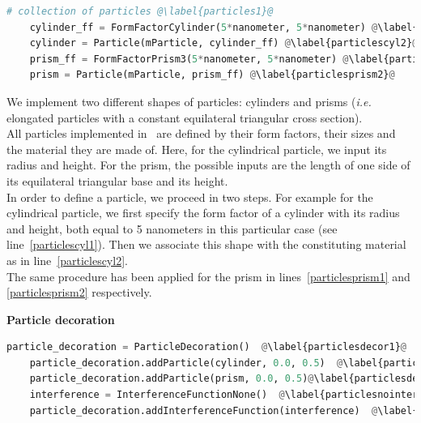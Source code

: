 
\begin{lstlisting}[language=python,style=eclipseboxed,name=ex1,nolol]
    # collection of particles @\label{particles1}@
    cylinder_ff = FormFactorCylinder(5*nanometer, 5*nanometer) @\label{particlescyl1}@
    cylinder = Particle(mParticle, cylinder_ff) @\label{particlescyl2}@
    prism_ff = FormFactorPrism3(5*nanometer, 5*nanometer) @\label{particlesprism1}@
    prism = Particle(mParticle, prism_ff) @\label{particlesprism2}@
\end{lstlisting}

 \noindent We implement two different shapes of particles: cylinders and
 prisms (\textit{i.e.} elongated particles with a constant equilateral triangular cross section).\\ All particles implemented in \BornAgain\ are defined by their
 form factors, their sizes and the material
  they are made of. Here, for the
  cylindrical particle, we input its radius and height.  For the prism, 
  the possible inputs are the length of one side of its equilateral triangular
  base and its height.\\

  
\noindent In order to define a particle, we proceed in two steps. For example for
the cylindrical particle, we first specify the form factor of a cylinder with 
its radius and height, both equal to 5 nanometers in this particular
case (see line~\ref{particlescyl1}). Then we associate this shape with
the constituting material as in line~\ref{particlescyl2}.\\

\noindent The same procedure has been applied for the prism in lines~\ref{particlesprism1} and \ref{particlesprism2} respectively.

\noindent \textbf{Particle decoration} \\
  

\begin{lstlisting}[language=python, style=eclipseboxed, name=ex1,nolol]
    particle_decoration = ParticleDecoration()  @\label{particlesdecor1}@
    particle_decoration.addParticle(cylinder, 0.0, 0.5)  @\label{particlesdecor2}@
    particle_decoration.addParticle(prism, 0.0, 0.5)@\label{particlesdecor3}@
    interference = InterferenceFunctionNone()  @\label{particlesnointerf}@
    particle_decoration.addInterferenceFunction(interference)  @\label{particlesinterf}@
\end{lstlisting}

